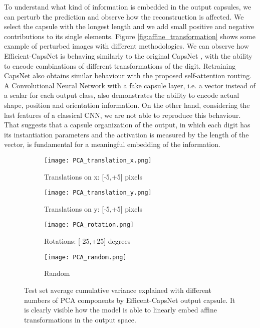 \documentclass{article}
\begin{document}
To understand what kind of information is embedded in the output capsules, we can perturb the prediction and observe how the reconstruction is affected. We select the capsule with the longest length and we add small positive and negative contributions to its single elements. Figure \ref{fig:affine_transformation} shows some example of perturbed images with different methodologies. We can observe how Efficient-CapsNet is behaving similarly to the original CapsNet \cite{sabour2017dynamic}, with the ability to encode combinations of different transformations of the digit. Retraining CapsNet also obtains similar behaviour with the proposed self-attention routing. A Convolutional Neural Network with a fake capsule layer, i.e. a vector instead of a scalar for each output class, also demonstrates the ability to encode actual shape, position and orientation information. On the other hand, considering the last features of a classical CNN, we are not able to reproduce this behaviour. That suggests that a capsule organization of the output, in which each digit has its instantiation parameters and the activation is measured by the length of the vector, is fundamental for a meaningful embedding of the information.
\begin{figure*}
\centering
\begin{subfigure}{0.45\textwidth}
  \centering
  \texttt{[image: PCA\_translation\_x.png]}
  \caption{Translations on x: [-5,+5] pixels}
\end{subfigure}
\begin{subfigure}{0.45\textwidth}
  \centering
  \texttt{[image: PCA\_translation\_y.png]}
  \caption{Translations on y: [-5,+5] pixels}
\end{subfigure}
\begin{subfigure}{0.45\textwidth}
  \centering
  \texttt{[image: PCA\_rotation.png]}
  \caption{Rotations: [-25,+25] degrees}
\end{subfigure}
\begin{subfigure}{0.45\textwidth}
  \centering
  \texttt{[image: PCA\_random.png]}
  \caption{Random}
\end{subfigure}
\caption{Test set average cumulative variance explained with different numbers of PCA components by Efficent-CapsNet output capsule. It is clearly visible how the model is able to linearly embed affine transformations in the output space.}
\label{fig:PCA}
\end{figure*}
\end{document}
